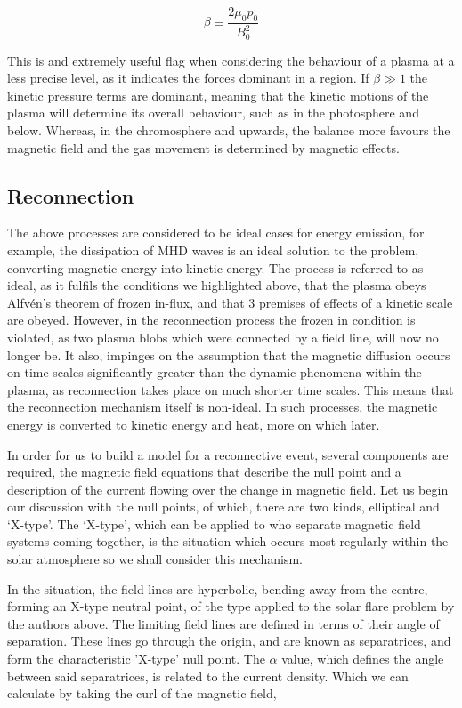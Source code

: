 \begin{equation}
	\beta \equiv \frac{2\mu_0p_0}{B_0^2}
\end{equation} 

\noindent This is and extremely useful flag when considering the behaviour of a plasma at a less precise level, as it indicates the forces dominant in a region.
If $\beta \gg 1$ the kinetic pressure terms are dominant, meaning that the kinetic motions of the plasma will determine its overall behaviour, such as in the photosphere and below.
Whereas, in the chromosphere and upwards, the balance more favours the magnetic field and the gas movement is determined by magnetic effects.
 

\subsection{Reconnection}
\label{sec:recon}

The above processes are considered to be ideal cases for energy emission, for example, the dissipation of MHD waves is an ideal solution to the problem, converting magnetic energy into kinetic energy.
The process is referred to as ideal, as it fulfils the conditions we highlighted above, that the plasma obeys Alfv{\'e}n's theorem of frozen in-flux, and that 3 premises of effects of a kinetic scale are obeyed.
However, in the reconnection process the frozen in condition is violated, as two plasma blobs which were connected by a field line, will now no longer be.
It also, impinges on the assumption that the magnetic diffusion occurs on time scales significantly greater than the dynamic phenomena within the plasma, as reconnection takes place on much shorter time scales.
This means that the reconnection mechanism itself is non-ideal.
In such processes, the magnetic energy is converted to kinetic energy and heat, more on which later.

In order for us to build a model for a reconnective event, several components are required, the magnetic field equations that describe the null point and a description of the current flowing over the change in magnetic field.
Let us begin our discussion with the null points, of which, there are two kinds, elliptical and `X-type'.
The `X-type', which can be applied to who separate magnetic field systems coming together, is the situation which occurs most regularly within the solar atmosphere so we shall consider this mechanism.

In the situation, the field lines are hyperbolic, bending away from the centre, forming an X-type neutral point, of the type applied to the solar flare problem by the authors above.
The limiting field lines are defined in terms of their angle of separation.
These lines go through the origin, and are known as separatrices, and form the characteristic 'X-type' null point. 
The $\bar{\alpha}$ value, which defines the angle between said separatrices, is related to the current density.
Which we can calculate by taking the curl of the magnetic field, \cite{Priest2007}

